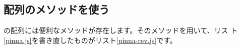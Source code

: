 \subsection{配列のメソッドを使う}
\JS の配列には便利なメソッドが存在します。そのメソッドを用いて、\JS リス
ト\ref{pinna.js}を書き直したものが\JS リスト\ref{pinna-rev.js}です。

